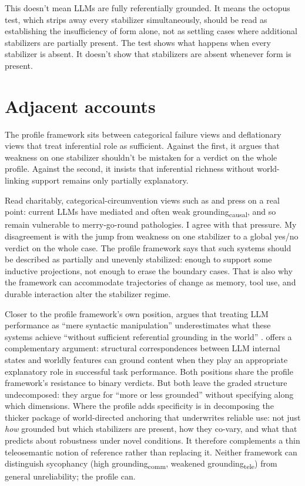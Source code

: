 \documentclass[12pt]{article}
\newcommand{\gtele}{grounding\textsubscript{tele}}
\newcommand{\gcausal}{grounding\textsubscript{causal}}
\newcommand{\gcomm}{grounding\textsubscript{comm}}
\begin{document}
This doesn't mean LLMs are fully referentially grounded. It means the octopus test, which strips away every stabilizer simultaneously, should be read as establishing the insufficiency of form alone, not as settling cases where additional stabilizers are partially present. The test shows what happens when every stabilizer is absent. It doesn't show that stabilizers are absent whenever form is present.

\section{Adjacent accounts}
\label{sec:adjacent}

The profile framework sits between categorical failure views and deflationary views that treat inferential role as sufficient. Against the first, it argues that weakness on one stabilizer shouldn't be mistaken for a verdict on the whole profile. Against the second, it insists that inferential richness without world-linking support remains only partially explanatory.

Read charitably, categorical-circumvention views such as \textcite{floridi_jia_tohme_2025_categorical_analysis_llms} and \textcite{manheim_2026_hall_of_mirrors_peircean} press on a real point: current LLMs have mediated and often weak \gcausal{}, and so remain vulnerable to merry-go-round pathologies. I agree with that pressure. My disagreement is with the jump from weakness on one stabilizer to a global yes/no verdict on the whole case. The profile framework says that such systems should be described as partially and unevenly stabilized: enough to support some inductive projections, not enough to erase the boundary cases. That is also why the framework can accommodate trajectories of change as memory, tool use, and durable interaction alter the stabilizer regime.

Closer to the profile framework's own position, \textcite{havlik_2023_meaning_understanding_llms} argues that treating LLM performance as \enquote{mere syntactic manipulation} underestimates what these systems achieve \enquote{without sufficient referential grounding in the world} \citep[1]{havlik_2023_meaning_understanding_llms}. \textcite{williams_forthcoming_structural_correspondences_llms} offers a complementary argument: structural correspondences between LLM internal states and worldly features can ground content when they play an appropriate explanatory role in successful task performance. Both positions share the profile framework's resistance to binary verdicts. But both leave the graded structure undecomposed: they argue for \enquote{more or less grounded} without specifying along which dimensions. Where the profile adds specificity is in decomposing the thicker package of world-directed anchoring that underwrites reliable use: not just \emph{how} grounded but which stabilizers are present, how they co-vary, and what that predicts about robustness under novel conditions. It therefore complements a thin teleosemantic notion of reference rather than replacing it. Neither framework can distinguish sycophancy (high \gcomm{}, weakened \gtele{}) from general unreliability; the profile can.
\end{document}
